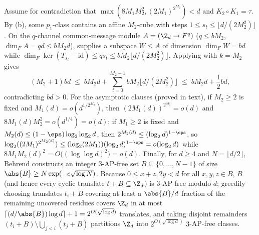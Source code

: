 \begin{outline}
Assume for contradiction that $\max(8M_1 M_2^2, (2M_1)^{2^{M_2}}) < d$ and $K_2 \circ K_1 = \tau$.
By (b), some $p_1$-class contains an affine $M_2$-cube with steps
$1 \le s_t \le \lfloor d/(2M_2^2)\rfloor$. On the $q$-channel common-message module
$A = (\Z_d \to F^q)$ ($q \le b M_2$, $\dim_F A = qd \le b M_2 d$),
\cite[Lemma~6.1 and Theorem~6.3]{SharedDecoders2026} supplies a subspace $W \le A$ of dimension
$\dim_F W = bd$ while $\dim_F\ker(T_{s_t} - \mathrm{id}) \le q s_t \le b M_2 \lfloor d/(2M_2^2)\rfloor$.
Applying  with $k = M_2$ gives
\[
  (M_2 + 1) bd \;\le\; b M_2 d + \sum_{t=0}^{M_2 - 1} b M_2 \lfloor d/(2 M_2^2)\rfloor
  \;\le\; b M_2 d + \frac{1}{2} bd,
\]
contradicting $bd > 0$. For the asymptotic clauses (proved in text), if $M_2 \ge 2$ is fixed and
$M_1(d) = o(d^{1/2^{M_2}})$, then $(2M_1(d))^{2^{M_2}} = o(d)$ and $8M_1(d)M_2^2 = o(d^{1/4}) = o(d)$;
if $M_1 \ge 2$ is fixed and $M_2(d) \le (1 - \eps)\log_2\log_2 d$, then $2^{M_2(d)} \le (\log_2 d)^{1-\eps}$,
so $\log_2((2M_1)^{2^{M_2(d)}}) \le (\log_2(2M_1))(\log_2 d)^{1-\eps} = o(\log_2 d)$ while
$8M_1 M_2(d)^2 = O\bigl((\log\log d)^2\bigr) = o(d)$. Finally, for
$d \ge 4$ and $N = \lfloor d/2\rfloor$, Behrend \cite{Behrend1946} constructs an integer $3$-AP-free
set $B \subseteq \{0, \dots, N-1\}$ of size $\abs{B} \ge N\exp(-c\sqrt{\log N})$. Because
$0 \le x + z, 2y < d$ for all $x, y, z \in B$, $B$ (and hence every cyclic translate $t + B \subseteq
\Z_d$) is $3$-AP-free modulo $d$; greedily choosing translates $t_i + B$ covering at least a
$\abs{B}/d$ fraction of the remaining uncovered residues covers $\Z_d$ in at most
$\lceil (d/\abs{B})\log d\rceil + 1 = 2^{O(\sqrt{\log d})}$ translates, and taking disjoint
remainders $(t_i + B) \setminus \bigcup_{j < i}(t_j + B)$ partitions $\Z_d$ into
$2^{O(\sqrt{\log d})}$ $3$-AP-free classes.
\end{outline}


